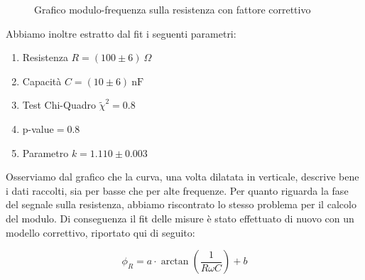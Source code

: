 \documentclass[letterpaper,12pt]{article}
\begin{document}
\begin{figure}[h!]
    \centering
    \caption{Grafico modulo-frequenza sulla resistenza con fattore correttivo}
    \label{fig:RC_R_modulo_correzione}
\end{figure}

Abbiamo inoltre estratto dal fit i seguenti parametri:
\begin{enumerate}
    \item Resistenza $R = (100\pm6)\ \Omega$
    \item Capacità $ C = (10\pm 6)\ \text{nF}$
    \item Test Chi-Quadro  $\widetilde{\chi}^2 = 0.8$
    \item p-value$= 0.8 $
    \item Parametro $k = 1.110\pm0.003$
\end{enumerate}
Osserviamo dal grafico che la curva, una volta dilatata in verticale, descrive bene i dati raccolti, sia per basse che per alte frequenze.
\newpage
Per quanto riguarda la fase del segnale sulla resistenza, abbiamo riscontrato lo stesso problema per il calcolo del modulo. Di conseguenza il fit delle misure è stato effettuato di nuovo con un modello correttivo, riportato qui di seguito:

\begin{equation}
    \label{eq:Fase RC (resistenza) correttivo}
    \phi_R = a \cdot \arctan\left(\frac{1}{R\omega C}\right) + b
\end{equation}
\end{document}
